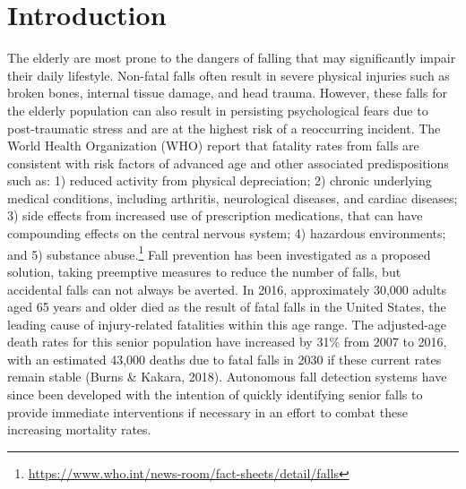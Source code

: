 \documentclass{llncs}
\begin{document}
\section{Introduction}

The elderly are most prone to the dangers of falling that may significantly impair their daily lifestyle. Non-fatal falls often result in severe physical injuries such as broken bones, internal tissue damage, and head trauma. However, these falls for the elderly population can also result in persisting psychological fears due to post-traumatic stress and are at the highest risk of a reoccurring incident. The World Health Organization (WHO) report that fatality rates from falls are consistent with risk factors of advanced age and other associated predispositions such as: 1) reduced activity from physical depreciation; 2) chronic underlying medical conditions, including arthritis, neurological diseases, and cardiac diseases; 3) side effects from increased use of prescription medications, that can have compounding effects on the central nervous system;  4) hazardous environments; and 5) substance abuse.\footnote{\url{https://www.who.int/news-room/fact-sheets/detail/falls}} Fall prevention has been investigated as a proposed solution, taking preemptive measures to reduce the number of falls, but accidental falls can not always be averted.  In 2016, approximately 30,000 adults aged 65 years and older died as the result of fatal falls in the United States, the leading cause of injury-related fatalities within this age range. The adjusted-age death rates for this senior population have increased by 31\% from 2007 to 2016, with an estimated 43,000 deaths due to fatal falls in 2030 if these current rates remain stable (Burns \& Kakara, 2018).\cite{burns2018deaths} Autonomous fall detection systems have since been developed with the intention of quickly identifying senior falls to provide immediate interventions if necessary in an effort to combat these increasing mortality rates.
\end{document}
